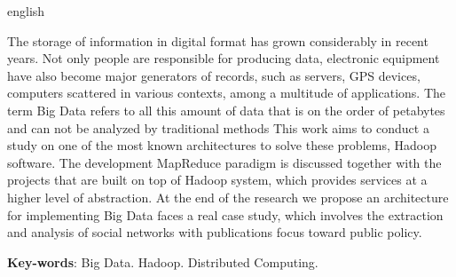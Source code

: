 \begin{resumo}[Abstract]
 \begin{otherlanguage*}{english}

The storage of information in digital format has grown considerably in recent years. Not only people are responsible for producing data, electronic equipment have also become major generators of records, such as servers, GPS devices, computers scattered in various contexts, among a multitude of applications. The term Big Data refers to all this amount of data that is on the order of petabytes and can not be analyzed by traditional methods This work aims to conduct a study on one of the most known architectures to solve these problems, Hadoop software. The development MapReduce paradigm is discussed together with the projects that are built on top of Hadoop system, which provides services at a higher level of abstraction. At the end of the research we propose an architecture for implementing Big Data faces a real case study, which involves the extraction and analysis of social networks with publications focus toward public policy.

   \vspace{\onelineskip}
 
   \noindent 
   \textbf{Key-words}: Big Data. Hadoop. Distributed Computing.
 \end{otherlanguage*}
\end{resumo}
